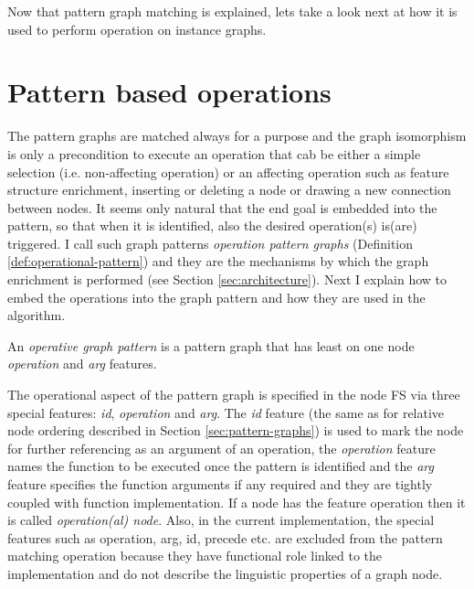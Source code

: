 Now that pattern graph matching is explained, lets take a look next at how it is used to perform operation on instance graphs.

\section{Pattern based operations}
\label{sec:pattern-based-operations}


The pattern graphs are matched always for a purpose and the graph isomorphism is only a precondition to execute an operation that cab be either a simple selection (i.e. non-affecting operation) or an affecting operation such as feature structure enrichment, inserting or deleting a node or drawing a new connection between nodes. It seems only natural that the end goal is embedded into the pattern, so that when it is identified, also the desired operation(s) is(are) triggered. I call such graph patterns \textit{operation pattern graphs} (Definition \ref{def:operational-pattern}) and they are the mechanisms by which the graph enrichment is performed (see Section \ref{sec:architecture}). Next I explain how to embed the operations into the graph pattern and how they are used in the algorithm. 

\begin{definition}\label{def:operational-pattern}
    An \textit{operative graph pattern} is a pattern graph that has least on one node \textit{operation} and \textit{arg} features.
\end{definition}

The operational aspect of the pattern graph is specified in the node FS via three special features: \textit{id}, \textit{operation} and \textit{arg}. The \textit{id} feature (the same as for relative node ordering described in Section \ref{sec:pattern-graphs}) is used to mark the node for further referencing as an argument of an operation, the \textit{operation} feature names the function to be executed once the pattern is identified and the \textit{arg} feature specifies the function arguments if any required and they are tightly coupled with function implementation. If a node has the feature operation then it is called \textit{operation(al) node}. Also, in the current implementation, the special features such as operation, arg, id, precede etc. are excluded from the pattern matching operation because they have functional role linked to the implementation and do not describe the linguistic properties of a graph node.

